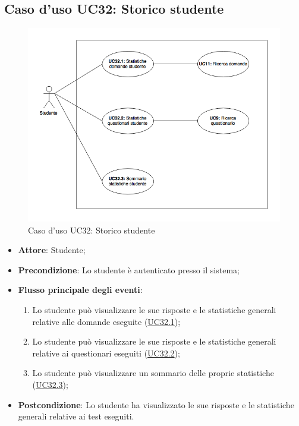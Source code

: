 \documentclass[12pt,a4paper]{article}
\begin{document}
\subsection{Caso d'uso UC32: Storico studente}
\begin{figure}[H]
	\centering
	\includegraphics[width=\textwidth]{diagramUC32.png}
	\caption{Caso d'uso UC32: Storico studente}\label{fig:UC32} 
\end{figure}
\begin{itemize}

\item \textbf{Attore}: Studente; 
\item \textbf{Precondizione}: Lo studente è autenticato presso il sistema;

\item \textbf{Flusso principale degli eventi}:
\begin{enumerate}
	\item Lo studente può visualizzare le sue risposte e le statistiche generali relative alle domande eseguite (\hyperlink{UC32.1}{UC32.1});
	\item Lo studente può visualizzare le sue risposte e le statistiche generali relative ai questionari eseguiti (\hyperlink{UC32.2}{UC32.2});
	\item Lo studente può visualizzare un sommario delle proprie statistiche (\hyperlink{UC32.3}{UC32.3});
	
\end{enumerate}
\item \textbf{Postcondizione}: Lo studente ha visualizzato le sue risposte e le statistiche generali relative ai test eseguiti.
\end{itemize}
\hypertarget{UC32.1}{}
\end{document}

